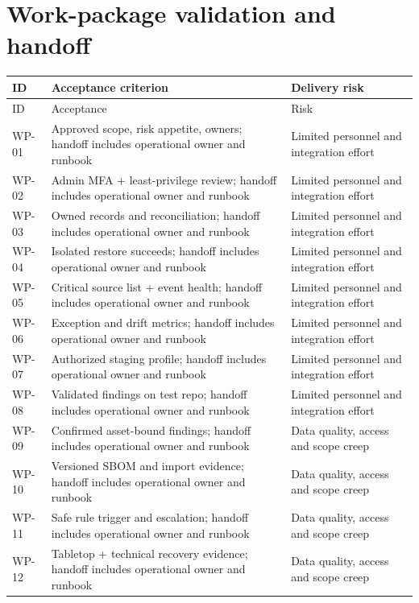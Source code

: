 \documentclass[11pt,oneside]{report}
\begin{document}
\section{Work-package validation and handoff}
\begin{longtable}{P{0.1\textwidth}P{0.60\textwidth}P{0.19\textwidth}}
\toprule ID & Acceptance criterion & Delivery risk\\\midrule\endfirsthead
\toprule ID & Acceptance & Risk\\\midrule\endhead

WP-01 & Approved scope, risk appetite, owners; handoff includes operational owner and runbook & Limited personnel and integration effort \\
WP-02 & Admin MFA + least-privilege review; handoff includes operational owner and runbook & Limited personnel and integration effort \\
WP-03 & Owned records and reconciliation; handoff includes operational owner and runbook & Limited personnel and integration effort \\
WP-04 & Isolated restore succeeds; handoff includes operational owner and runbook & Limited personnel and integration effort \\
WP-05 & Critical source list + event health; handoff includes operational owner and runbook & Limited personnel and integration effort \\
WP-06 & Exception and drift metrics; handoff includes operational owner and runbook & Limited personnel and integration effort \\
WP-07 & Authorized staging profile; handoff includes operational owner and runbook & Limited personnel and integration effort \\
WP-08 & Validated findings on test repo; handoff includes operational owner and runbook & Limited personnel and integration effort \\
WP-09 & Confirmed asset-bound findings; handoff includes operational owner and runbook & Data quality, access and scope creep \\
WP-10 & Versioned SBOM and import evidence; handoff includes operational owner and runbook & Data quality, access and scope creep \\
WP-11 & Safe rule trigger and escalation; handoff includes operational owner and runbook & Data quality, access and scope creep \\
WP-12 & Tabletop + technical recovery evidence; handoff includes operational owner and runbook & Data quality, access and scope creep \\

\end{longtable}
\end{document}

